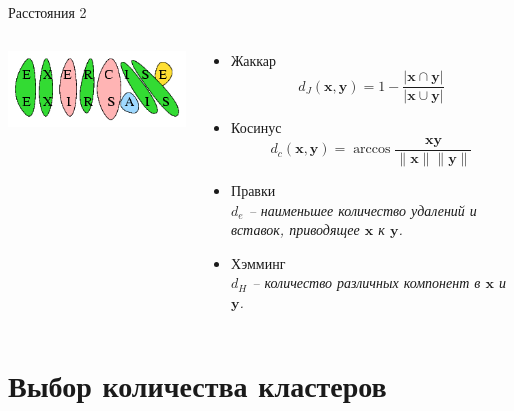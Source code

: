 \documentclass[aspectratio=169]{beamer}
\begin{document}
\begin{frame}{Расстояния 2}

\begin{columns}[T]

    \begin{column}{.4\textwidth}
    \vspace{5em}
	\begin{center}
   		\includegraphics[scale=0.5]{images/edit.png}
    \end{center}
    \end{column}

    \begin{column}{.6\textwidth}
    \begin{itemize}
		\item Жаккар
		\[
		d_J(\mathbf{x}, \mathbf{y}) = 1 - \frac{|\mathbf{x} \cap \mathbf{y}|}{|\mathbf{x} \cup \mathbf{y}|}
		\]
		\item Косинус
		\[
		d_c(\mathbf{x}, \mathbf{y}) = \arccos \frac{\mathbf{x} \mathbf{y}}{\|\mathbf{x}\| \|\mathbf{y}\|}
		\]
		\item Правки \\
		{\it $d_e$ -- наименьшее количество удалений и вставок, приводящее $\mathbf{x}$ к $\mathbf{y}$.}
		\item Хэмминг \\
		{\it $d_H$ -- количество различных компонент в $\mathbf{x}$ и $\mathbf{y}$.}
	\end{itemize}

    \end{column}
  \end{columns}

\end{frame}


\section{Выбор количества кластеров}

\end{document}
